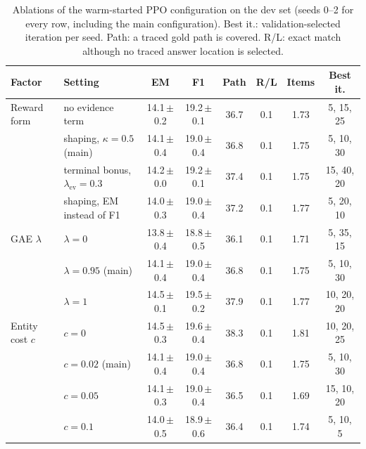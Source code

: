 \begin{table}[t]
\centering
\footnotesize
\caption{Ablations of the warm-started PPO configuration on the dev set (seeds 0--2 for every row, including the main configuration). Best it.: validation-selected iteration per seed. Path: a traced gold path is covered. R/L: exact match although no traced answer location is selected.}
\label{tab:ablation}
\setlength{\tabcolsep}{4pt}
\begin{tabular}{@{}llcccccc@{}}
\toprule
Factor & Setting & EM & F1 & Path & R/L & Items & Best it. \\
\midrule
Reward form & no evidence term & 14.1\,{\scriptsize$\pm$0.2} & 19.2\,{\scriptsize$\pm$0.1} & 36.7 & 0.1 & 1.73 & 5, 15, 25 \\
 & shaping, $\kappa=0.5$ (main) & 14.1\,{\scriptsize$\pm$0.4} & 19.0\,{\scriptsize$\pm$0.4} & 36.8 & 0.1 & 1.75 & 5, 10, 30 \\
 & terminal bonus, $\lambda_{\mathrm{ev}}=0.3$ & 14.2\,{\scriptsize$\pm$0.0} & 19.2\,{\scriptsize$\pm$0.1} & 37.4 & 0.1 & 1.75 & 15, 40, 20 \\
 & shaping, EM instead of F1 & 14.0\,{\scriptsize$\pm$0.3} & 19.0\,{\scriptsize$\pm$0.4} & 37.2 & 0.1 & 1.77 & 5, 20, 10 \\
\midrule
GAE $\lambda$ & $\lambda=0$ & 13.8\,{\scriptsize$\pm$0.4} & 18.8\,{\scriptsize$\pm$0.5} & 36.1 & 0.1 & 1.71 & 5, 35, 15 \\
 & $\lambda=0.95$ (main) & 14.1\,{\scriptsize$\pm$0.4} & 19.0\,{\scriptsize$\pm$0.4} & 36.8 & 0.1 & 1.75 & 5, 10, 30 \\
 & $\lambda=1$ & 14.5\,{\scriptsize$\pm$0.1} & 19.5\,{\scriptsize$\pm$0.2} & 37.9 & 0.1 & 1.77 & 10, 20, 20 \\
\midrule
Entity cost $c$ & $c=0$ & 14.5\,{\scriptsize$\pm$0.3} & 19.6\,{\scriptsize$\pm$0.4} & 38.3 & 0.1 & 1.81 & 10, 20, 25 \\
 & $c=0.02$ (main) & 14.1\,{\scriptsize$\pm$0.4} & 19.0\,{\scriptsize$\pm$0.4} & 36.8 & 0.1 & 1.75 & 5, 10, 30 \\
 & $c=0.05$ & 14.1\,{\scriptsize$\pm$0.3} & 19.0\,{\scriptsize$\pm$0.4} & 36.5 & 0.1 & 1.69 & 15, 10, 20 \\
 & $c=0.1$ & 14.0\,{\scriptsize$\pm$0.5} & 18.9\,{\scriptsize$\pm$0.6} & 36.4 & 0.1 & 1.74 & 5, 10, 5 \\
\bottomrule
\end{tabular}
\end{table}
